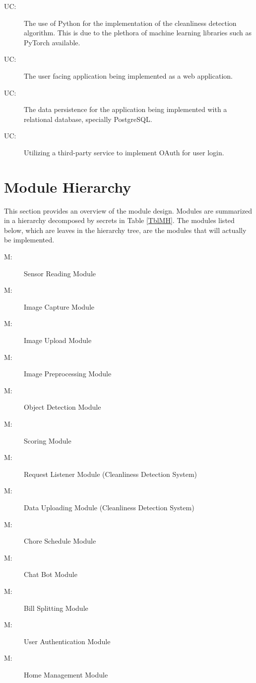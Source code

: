 \documentclass[12pt, titlepage]{article}
\newcounter{ucnum}
\newcommand{\uctheucnum}{UC\theucnum}
\newcounter{mnum}
\newcommand{\mthemnum}{M\themnum}
\begin{document}
\begin{description}
\item[ \uctheucnum \label{ucPython}:] The use of Python for the implementation of the cleanliness detection algorithm. This is due to the plethora of machine learning libraries such as PyTorch available.
\item[ \uctheucnum \label{ucWeb}:] The user facing application being implemented as a web application.
\item[ \uctheucnum \label{ucSql}:] The data persistence for the application being implemented with a relational database, specially PostgreSQL.
\item[ \uctheucnum \label{ucAuth}:]Utilizing a third-party service to implement OAuth for user login.
\end{description}

\section{Module Hierarchy} \label{SecMH}

This section provides an overview of the module design. Modules are summarized
in a hierarchy decomposed by secrets in Table \ref{TblMH}. The modules listed
below, which are leaves in the hierarchy tree, are the modules that will
actually be implemented.

\begin{description}
\item [ \mthemnum \label{mSR}:] Sensor Reading Module
\item [ \mthemnum \label{mIC}:] Image Capture Module
\item [ \mthemnum \label{mIU}:] Image Upload Module
\item [ \mthemnum \label{mIP}:] Image Preprocessing Module
\item [ \mthemnum \label{mOD}:] Object Detection Module
\item [ \mthemnum \label{mS}:] Scoring Module 
\item [ \mthemnum \label{mRL}:] Request Listener Module (Cleanliness Detection System)
\item [ \mthemnum \label{mDU}:] Data Uploading Module (Cleanliness Detection System)
\item [ \mthemnum \label{mCS}:] Chore Schedule Module
\item [ \mthemnum \label{mCB}:] Chat Bot Module
\item [ \mthemnum \label{mBS}:] Bill Splitting Module
\item [ \mthemnum \label{mUA}:] User Authentication Module
\item [ \mthemnum \label{mHM}:] Home Management Module
\end{description}
\end{document}
